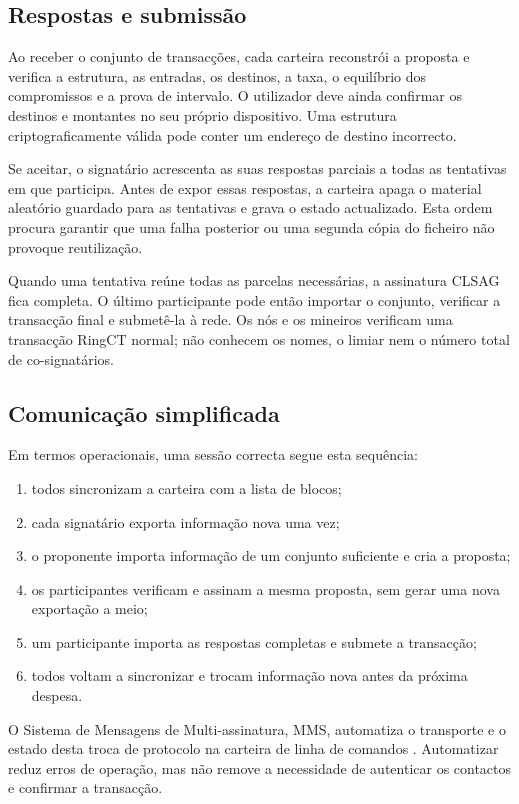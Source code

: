\subsection{Respostas e submissão}

Ao receber o conjunto de transacções, cada carteira reconstrói a proposta e
verifica a estrutura, as entradas, os destinos, a taxa, o equilíbrio dos
compromissos e a prova de intervalo. O utilizador deve ainda confirmar os
destinos e montantes no seu próprio dispositivo. Uma estrutura
criptograficamente válida pode conter um endereço de destino incorrecto.

%
Se aceitar, o signatário acrescenta as suas respostas parciais a todas as
tentativas em que participa. Antes de expor essas respostas, a carteira apaga
o material aleatório guardado para as tentativas e grava o estado actualizado.
Esta ordem procura garantir que uma falha posterior ou uma segunda cópia do
ficheiro não provoque reutilização.

Quando uma tentativa reúne todas as parcelas necessárias, a assinatura CLSAG
fica completa. O último participante pode então importar o conjunto, verificar
a transacção final e submetê-la à rede. Os nós e os mineiros verificam uma
transacção RingCT normal; não conhecem os nomes, o limiar nem o número total de
co-signatários.

\subsection{Comunicação simplificada}
\label{sec:simplified-communication}

Em termos operacionais, uma sessão correcta segue esta sequência:
\begin{enumerate}
 \item todos sincronizam a carteira com a lista de blocos;
 \item cada signatário exporta informação nova uma vez;
 \item o proponente importa informação de um conjunto suficiente e cria a
 proposta;
 \item os participantes verificam e assinam a mesma proposta, sem gerar uma
 nova exportação a meio;
 \item um participante importa as respostas completas e submete a
 transacção;
 \item todos voltam a sincronizar e trocam informação nova antes da próxima
 despesa.
\end{enumerate}
O Sistema de Mensagens de Multi-assinatura, MMS, automatiza o transporte e o
estado desta troca de protocolo na carteira de linha de comandos
\cite{mms-manual,mms-project-proposal}. Automatizar reduz erros de operação,
mas não remove a necessidade de autenticar os contactos e confirmar a
transacção.

